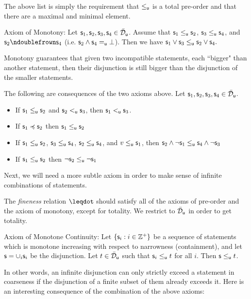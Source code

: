 \documentclass{article}
\begin{document}
The above list is simply the requirement that $\leq_{\stmt[u]}$ is a total pre-order and that there are a maximal and minimal element. 


Axiom of Monotony: 
Let $\stmt_1,\stmt_2,\stmt_3,\stmt_4\in \tdomain_{\stmt[u]}$. Assume that $\stmt_1\leq_{\stmt[u]} \stmt_2$, $\stmt_3\leq_{\stmt[u]} \stmt_4$, and $\stmt_2\ncomp \stmt_4$ (i.e. $\stmt_2\AND \stmt_4 =_{\stmt[u]} \impossibility$). Then we have $\stmt_1\OR \stmt_3 \leq_{\stmt[u]} \stmt_2\OR \stmt_4.$

Monotony guarantees that given two incompatible statements, each ``bigger" than another statement, then their disjunction is still bigger than the disjunction of the smaller statements. 

The following are consequences of the two axioms above. Let $\stmt_1,\stmt_2,\stmt_3,\stmt_4\in \tdomain_{\stmt[u]}$.
\begin{itemize}
    \item If $\stmt_1\leq_{\stmt[u]} \stmt_2$ and $\stmt_2<_{\stmt[u]} \stmt_3$, then $\stmt_1<_{\stmt[u]}\stmt_3$. 
    \item If $\stmt_1\narrower \stmt_2$ then $\stmt_1\leq_{\stmt[u]} \stmt_2$
    \item If $\stmt_1\leq_{\stmt[u]} \stmt_2$, $\stmt_3\leq_{\stmt[u]} \stmt_4$, $\stmt_2\leq_{\stmt[u]} \stmt_4$, and $v\leq_{\stmt[u]} \stmt_1$, then $\stmt_2 \AND \NOT \stmt_1 \leq_{\stmt[u]} \stmt_4 \AND \NOT \stmt_3$
    \item If $\stmt_1\leq_{\stmt[u]} \stmt_2$ then $\NOT \stmt_2 \leq_{\stmt[u]}\NOT \stmt_1$
\end{itemize}

Next, we will need a more subtle axiom in order to make sense of infinite combinations of statements. 

\begin{remark}
The \emph{fineness} relation $\finer$ should satisfy all of the axioms of pre-order and the axiom of monotony, except for totality. We restrict to $\tdomain_{\stmt[u]}$ in order to get totality. 
\end{remark}

Axiom of Monotone Continuity:
Let $\{\stmt_i : i\in \mathbb{Z}^+\}$ be a sequence of statements which is monotone increasing with respect to narrowness (containment), and let $\stmt = \cup_i\stmt_i$ be the disjunction. Let $t\in \tdomain_{\stmt[u]}$ such that $\stmt_i\leq_{\stmt[u]} t$ for all $i$. Then $\stmt\leq_{\stmt[u]} t$. 

In other words, an infinite disjunction can only strictly exceed a statement in coarseness if the disjunction of a finite subset of them already exceeds it. Here is an interesting consequence of the combination of the above axioms:
\end{document}
